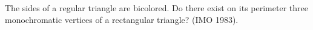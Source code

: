 The sides of a regular triangle are bicolored. Do there exist on its perimeter three monochromatic vertices of a rectangular triangle? (IMO 1983).

